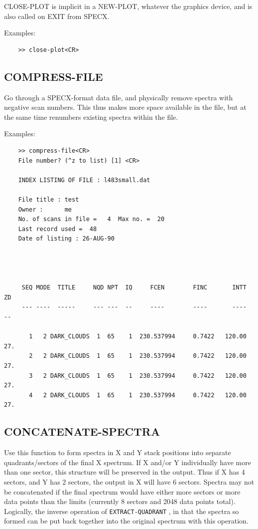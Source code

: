 \documentclass[11pt,twoside]{report}
\begin{document}
CLOSE-PLOT  is implicit in a NEW-PLOT,
whatever the graphics device, and is also called on EXIT from SPECX.

Examples:
\begin{verbatim}
    >> close-plot<CR>
\end{verbatim}

\subsection{COMPRESS-FILE} 

Go through a SPECX-format data file, and physically remove spectra with
negative scan numbers. This thus makes more space available in the file,
but at the same time renumbers existing spectra within the file.

Examples:
\begin{verbatim}
    >> compress-file<CR>
    File number? (^z to list) [1] <CR>

    INDEX LISTING OF FILE : l483small.dat

    File title : test
    Owner :      me
    No. of scans in file =   4  Max no. =  20
    Last record used =  48
    Date of listing : 26-AUG-90




     SEQ MODE  TITLE     NQD NPT  IQ     FCEN        FINC       INTT    ZD
     --- ----  -----     --- ---  --     ----        ----       ----    --

       1   2 DARK_CLOUDS  1  65    1  230.537994     0.7422   120.00    27.
       2   2 DARK_CLOUDS  1  65    1  230.537994     0.7422   120.00    27.
       3   2 DARK_CLOUDS  1  65    1  230.537994     0.7422   120.00    27.
       4   2 DARK_CLOUDS  1  65    1  230.537994     0.7422   120.00    27.
\end{verbatim}

\subsection{CONCATENATE-SPECTRA} 

Use this function to form spectra in X and Y stack positions into separate
quadrants/sectors of the final X spectrum. If X and/or Y individually have more
than one sector, this structure will be preserved in the output. Thus if X has
4 sectors, and Y has 2 sectors, the output in X will have 6 sectors. Spectra
may not be concatenated if the final spectrum would have either more sectors or
more data points than the limits (currently 8 sectors and 2048 data points
total). Logically, the inverse operation of \verb+EXTRACT-QUADRANT+
, in that the spectra so formed can be put back
together into the original spectrum with this operation.
\end{document}
